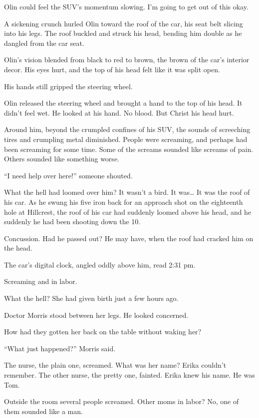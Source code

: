 Olin could feel the SUV’s momentum slowing. I’m going to get out of this okay.

A sickening crunch hurled Olin toward the roof of the car, his seat belt slicing into his legs. The roof buckled and struck his head, bending him double as he dangled from the car seat.

Olin’s vision blended from black to red to brown, the brown of the car’s interior decor. His eyes hurt, and the top of his head felt like it was split open.

His hands still gripped the steering wheel.

Olin released the steering wheel and brought a hand to the top of his head. It didn’t feel wet. He looked at his hand. No blood. But Christ his head hurt.

Around him, beyond the crumpled confines of his SUV, the sounds of screeching tires and crumpling metal diminished. People were screaming, and perhaps had been screaming for some time. Some of the screams sounded like screams of pain. Others sounded like something worse.

“I need help over here!” someone shouted.

What the hell had loomed over him? It wasn’t a bird. It was… It was the roof of his car. As he swung his five iron back for an approach shot on the eighteenth hole at Hillcrest, the roof of his car had suddenly loomed above his head, and he suddenly he had been shooting down the 10.

Concussion. Had he passed out? He may have, when the roof had cracked him on the head.

The car’s digital clock, angled oddly above him, read 2:31 pm.




 Screaming and in labor.

What the hell? She had given birth just a few hours ago.

Doctor Morris stood between her legs. He looked concerned.

How had they gotten her back on the table without waking her?

“What just happened?” Morris said.

The nurse, the plain one, screamed. What was her name? Erika couldn’t remember. The other nurse, the pretty one, fainted. Erika knew his name. He was Tom.

Outside the room several people screamed. Other moms in labor? No, one of them sounded like a man.

